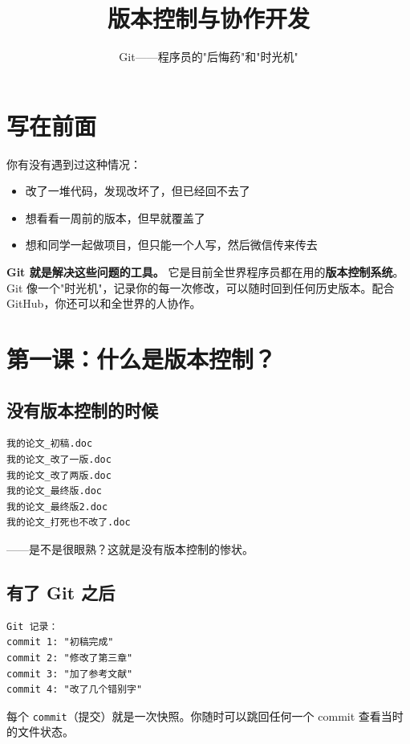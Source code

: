 \documentclass[a4paper,12pt]{ctexart}
\title{\textcolor{blue!70!black}{\Huge\textbf{版本控制与协作开发}}}
\author{Git——程序员的"后悔药"和"时光机"}
\date{}
\begin{document}
\maketitle
\thispagestyle{empty}

\section*{写在前面}

你有没有遇到过这种情况：
\begin{itemize}
  \item 改了一堆代码，发现改坏了，但已经回不去了
  \item 想看看一周前的版本，但早就覆盖了
  \item 想和同学一起做项目，但只能一个人写，然后微信传来传去
\end{itemize}

\textbf{Git 就是解决这些问题的工具。} 它是目前全世界程序员都在用的\textbf{版本控制系统}。Git 像一个"时光机"，记录你的每一次修改，可以随时回到任何历史版本。配合 GitHub，你还可以和全世界的人协作。

\section*{第一课：什么是版本控制？}

\subsection*{没有版本控制的时候}

\begin{verbatim}
我的论文_初稿.doc
我的论文_改了一版.doc
我的论文_改了两版.doc
我的论文_最终版.doc
我的论文_最终版2.doc
我的论文_打死也不改了.doc
\end{verbatim}

——是不是很眼熟？这就是没有版本控制的惨状。

\subsection*{有了 Git 之后}

\begin{verbatim}
Git 记录：
commit 1: "初稿完成"
commit 2: "修改了第三章"
commit 3: "加了参考文献"
commit 4: "改了几个错别字"
\end{verbatim}

每个 \texttt{commit}（提交）就是一次快照。你随时可以跳回任何一个 commit 查看当时的文件状态。
\end{document}
